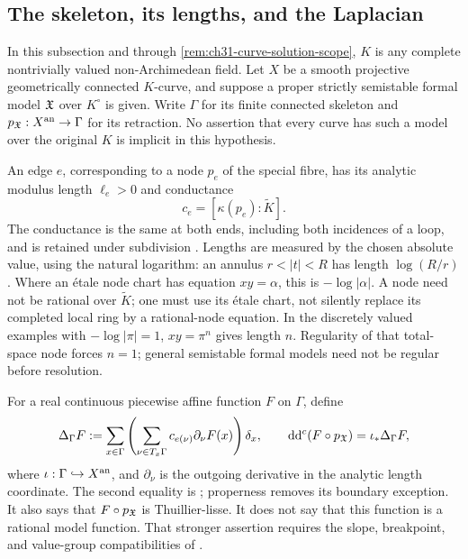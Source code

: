 
\subsection{The skeleton, its lengths, and the Laplacian}
\label{sec:ch31-curve-setup}

In this subsection and through \cref{rem:ch31-curve-solution-scope},
\(K\) is any complete nontrivially valued non-Archimedean field.
Let \(X\) be a smooth projective geometrically connected \(K\)-curve,
and suppose a proper strictly semistable formal model \(\mathfrak X\) over
\(K^\circ\) is given.  Write \(\Gamma\) for its finite connected
skeleton and \(p_{\mathfrak X}:X^{\mathrm{an}}\to\Gamma\) for its retraction.
No assertion that every curve has such a model over the original
\(K\) is implicit in this hypothesis.

An edge \(e\), corresponding to a node \(p_e\) of the special fibre,
has its analytic modulus length \(\ell_e>0\) and conductance
\[
                    c_e=[\kappa(p_e):\widetilde K].
\]
The conductance is the same at both ends, including both incidences
of a loop, and is retained under subdivision
\cite[\S2.2.3, p.~41]{Thu05}.
Lengths are measured by the chosen absolute value, using the natural
logarithm: an annulus \(r<|t|<R\) has length \(\log(R/r)\).
Where an \'{e}tale node chart has equation \(xy=\alpha\), this is
\(-\log|\alpha|\).  A node need not be rational over \(\widetilde K\);
one must use its \'{e}tale chart, not silently replace its completed
local ring by a rational-node equation.  In the discretely valued
examples with \(-\log|\pi|=1\), \(xy=\pi^n\) gives length \(n\).
Regularity of that total-space node forces \(n=1\); general
semistable formal models need not be regular before resolution.

For a real continuous piecewise affine function \(F\) on \(\Gamma\),
define
\begin{equation}
\label{eq:ch31-graph-laplacian}
 \Delta_\Gamma F
   :=\sum_{x\in\Gamma}
       \left(\sum_{\nu\in T_x\Gamma}
              c_{e(\nu)}\partial_\nu F(x)\right)\delta_x,
 \qquad
 \mathrm d\mathrm d^c(F\circ p_{\mathfrak X})=\iota_*\Delta_\Gamma F ,
\end{equation}
where \(\iota:\Gamma\hookrightarrow X^{\mathrm{an}}\), and
\(\partial_\nu\) is the outgoing derivative in the analytic length
coordinate.  The second equality is
\cite[Theorem~3.2.10(ii)]{Thu05}; properness removes its boundary
exception.  It also says that \(F\circ p_{\mathfrak X}\) is Thuillier-lisse.
It does not say that this function is a rational model function.
That stronger assertion requires the slope, breakpoint, and value-group
compatibilities of \cite[Proposition~3.5]{GJKM19}.

